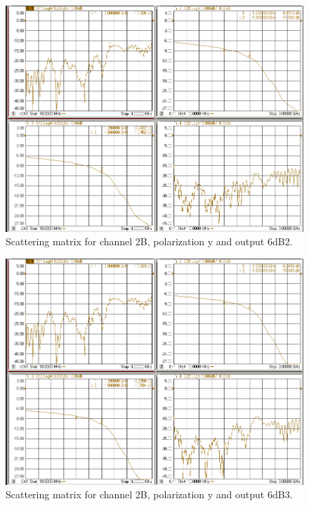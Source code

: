 \documentclass[12pt,a4paper,oneside]{article}
\begin{document}
\begin{figure}[H]
\centering
\includegraphics[width=0.9\linewidth]{VNA_results/2By_6dB2.png}
\caption{Scattering matrix for channel 2B, polarization y and output 6dB2.}
\label{fig:2By_6dB2}
\end{figure}


\begin{figure}[H]
\centering
\includegraphics[width=0.9\linewidth]{VNA_results/2By_6dB3.png}
\caption{Scattering matrix for channel 2B, polarization y and output 6dB3.}
\label{fig:2By_6dB3}
\end{figure}
\end{document}
